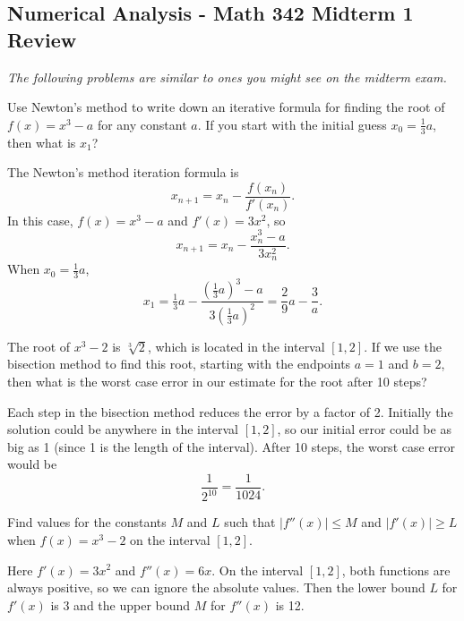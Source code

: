 \documentclass[11pt]{exam}
\begin{document}
\pagestyle{empty}
\graphicspath{{/home/brian/Dropbox/HSC/Spring16/Math111/}}

\subsection*{Numerical Analysis - Math 342 \hfill Midterm 1 Review}

\textit{The following problems are similar to ones you might see on the midterm exam.}

\begin{questions}

\question Use Newton's method to write down an iterative formula for finding the root of $f(x) = x^3-a$ for any constant $a$.  If you start with the initial guess $x_0 = \frac{1}{3}a$, then what is $x_1$?    

\begin{solution}
The Newton's method iteration formula is 
$$x_{n+1} = x_n - \frac{f(x_n)}{f'(x_n)}.$$
In this case, $f(x) = x^3 - a$ and $f'(x) = 3x^2$, so
$$x_{n+1} = x_n - \frac{x_n^3 - a}{3x_n^2}.$$
When $x_0 = \tfrac{1}{3}a$, 
$$x_1 = \tfrac{1}{3}a - \frac{(\tfrac{1}{3}a)^3 - a}{3(\frac{1}{3}a)^2} = \frac{2}{9}a - \frac{3}{a}.$$
\end{solution}

\question The root of $x^3-2$ is $\sqrt[3]{2}$, which is located in the interval $[1,2]$.  If we use the bisection method to find this root, starting with the endpoints $a=1$ and $b=2$, then what is the worst case error in our estimate for the root after 10 steps?  
\begin{solution}
Each step in the bisection method reduces the error by a factor of 2.  Initially the solution could be anywhere in the interval $[1,2]$, so our initial error could be as big as 1 (since 1 is the length of the interval).  After 10 steps, the worst case error would be 
$$\frac{1}{2^{10}} = \frac{1}{1024}.$$  
\end{solution}


\question Find values for the constants $M$ and $L$ such that $|f''(x)| \le M$ and $|f'(x)| \ge L$ when $f(x) = x^3-2$ on the interval $[1,2]$.  

\begin{solution}
Here $f'(x) = 3x^2$ and $f''(x) = 6x$.  On the interval $[1,2]$, both functions are always positive, so we can ignore the absolute values.  Then the lower bound $L$ for $f'(x)$ is $3$ and the upper bound $M$ for $f''(x)$ is 12.  
\end{solution}


\end{questions}
\end{document}
